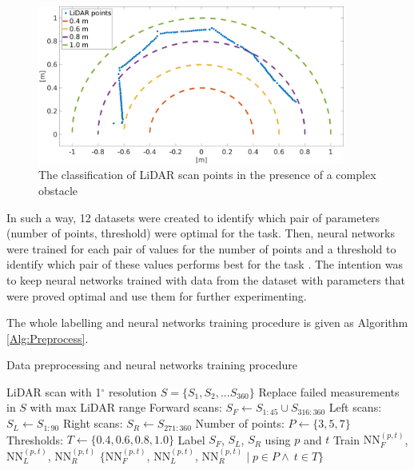 \begin{figure}
    \centering
    \includegraphics[width=0.9\textwidth]{slike/thr.png}
    \caption{The classification of LiDAR scan points in the presence of a complex obstacle}
    \label{fig:Threshold}
\end{figure}

In such a way, 12 datasets were created to identify which pair of parameters (number of points, threshold) were optimal for the task. Then, neural networks were trained for each pair of values for the number of points and a threshold to identify which pair of these values performs best for the task \cite{Kruzic2018}. The intention was to keep neural networks trained with data from the dataset with parameters that were proved optimal and use them for further experimenting.

The whole labelling and neural networks training procedure is given as Algorithm \ref{Alg:Preprocess}.

\begin{algorithm}
\caption{Data preprocessing and neural networks training procedure}
\label{Alg:Preprocess}
\begin{algorithmic}
	\renewcommand{\algorithmicrequire}{\textbf{Input:}}
    \renewcommand{\algorithmicensure}{\textbf{Output:}}
    \REQUIRE LiDAR scan with 1$^{\circ}$ resolution $S=\{S_1,S_2,...S_{360}\}$
    \STATE Replace failed measurements in $S$ with max LiDAR range
    \STATE Forward scans: $S_F \gets S_{1:45} \cup S_{316:360}$
    \STATE Left scans: $S_L \gets S_{1:90}$
    \STATE Right scans: $S_R \gets S_{271:360}$
    \STATE Number of points: $P \gets \{3,5,7\}$
    \STATE Thresholds: $T \gets \{0.4, 0.6, 0.8, 1.0\}$
          \STATE Label $S_F$, $S_L$, $S_R$ using $p$ and $t$
          \STATE Train $\mathrm{NN}_F^{(p,t)}$, $\mathrm{NN}_L^{(p,t)}$, $\mathrm{NN}_R^{(p,t)}$
      \ENDFOR
    \ENDFOR
    \ENSURE $\{\mathrm{NN}_F^{(p,t)}$, $\mathrm{NN}_L^{(p,t)}$, $\mathrm{NN}_R^{(p,t)} \mid p \in P \land~t \in T\}$
\end{algorithmic}
\end{algorithm}


